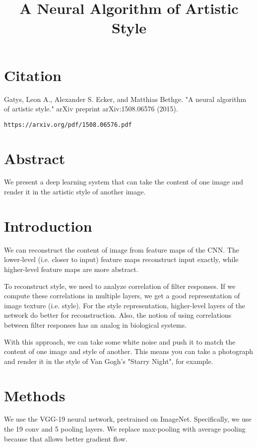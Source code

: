 \documentclass[a4paper]{article}
\title{A Neural Algorithm of Artistic Style}
\date{}
\begin{document}
\maketitle

\section{Citation}
Gatys, Leon A., Alexander S. Ecker, and Matthias Bethge. "A neural algorithm of artistic style." arXiv preprint arXiv:1508.06576 (2015).

\begin{verbatim}
https://arxiv.org/pdf/1508.06576.pdf
\end{verbatim}

\section{Abstract}
We present a deep learning system that can take the content of one image and
render it in the artistic style of another image.

\section{Introduction}
We can reconstruct the content of image from feature maps of the CNN. The
lower-level (i.e. closer to input) feature maps reconstruct input exactly,
while higher-level feature maps are more abstract.

To reconstruct style, we need to analyze correlation of filter responses. If
we compute these correlations in multiple layers, we get a good representation
of image texture (i.e. style). For the style representation, higher-level
layers of the network do better for reconstruction. Also, the notion of
using correlations between filter responses has an analog in biological
systems.

With this approach, we can take some white noise and push it to match the
content of one image and style of another. This means you can take a photograph
and render it in the style of Van Gogh's "Starry Night", for example.

\section{Methods}
We use the VGG-19 neural network, pretrained on ImageNet. Specifically, we
use the 19 conv and 5 pooling layers. We replace max-pooling with average
pooling because that allows better gradient flow.
\end{document}
